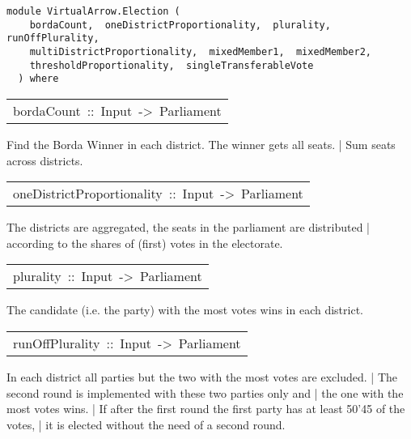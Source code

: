 \label{module:VirtualArrow.Election}
\haddockbeginheader
{\haddockverb\begin{verbatim}
module VirtualArrow.Election (
    bordaCount,  oneDistrictProportionality,  plurality,  runOffPlurality, 
    multiDistrictProportionality,  mixedMember1,  mixedMember2, 
    thresholdProportionality,  singleTransferableVote
  ) where\end{verbatim}}
\haddockendheader

\begin{haddockdesc}
\item[\begin{tabular}{@{}l}
bordaCount\ ::\ Input\ ->\ Parliament
\end{tabular}]\haddockbegindoc
Find the Borda Winner in each district. The winner gets all seats.
 | Sum seats across districts.\par

\end{haddockdesc}
\begin{haddockdesc}
\item[\begin{tabular}{@{}l}
oneDistrictProportionality\ ::\ Input\ ->\ Parliament
\end{tabular}]\haddockbegindoc
The districts are aggregated, the seats in the parliament are distributed
 | according to the shares of (first) votes in the electorate.\par

\end{haddockdesc}
\begin{haddockdesc}
\item[\begin{tabular}{@{}l}
plurality\ ::\ Input\ ->\ Parliament
\end{tabular}]\haddockbegindoc
The candidate (i.e. the party) with the most votes wins in each district.\par

\end{haddockdesc}
\begin{haddockdesc}
\item[\begin{tabular}{@{}l}
runOffPlurality\ ::\ Input\ ->\ Parliament
\end{tabular}]\haddockbegindoc
In each district all parties but the two with the most votes are excluded.
 | The second round is implemented with these two parties only and 
 | the one with the most votes wins. 
 | If after the first round the first party has at least 50{\char '45} of the votes, 
 | it is elected without the need of a second round. \par

\end{haddockdesc}
